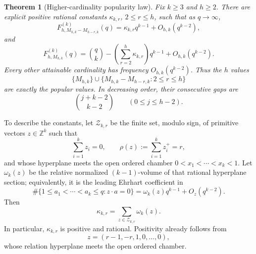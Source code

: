 \documentclass[11pt,reqno]{amsart}
\newtheorem{theorem}{Theorem}[section]
\theoremstyle{definition}
\theoremstyle{remark}
\begin{document}
\begin{theorem}[Higher-cardinality popularity law]
\label{thm:popularity-higher-k}
Fix $k\geq3$ and $h\geq2$.  There are explicit positive rational
constants $\kappa_{k,r}$, $2\leq r\leq h$, such that
as $q\to\infty$,
\begin{equation}\label{eq:pop-hk-tail}
 F^{(k)}_{h,M_{h,k}-M_{h-r,k}}(q)
 =\kappa_{k,r}q^{k-1}+O_{h,k}(q^{k-2}),
\end{equation}
and
\begin{equation}\label{eq:pop-hk-max}
 F^{(k)}_{h,M_{h,k}}(q)
 =\binom qk-
 \left(\sum_{r=2}^h\kappa_{k,r}\right)q^{k-1}
 +O_{h,k}(q^{k-2}).
\end{equation}
Every other attainable cardinality has frequency $O_{h,k}(q^{k-2})$.
Thus the $h$ values
\begin{equation}\label{eq:pop-hk-values}
 \{M_{h,k}\}\cup
 \{M_{h,k}-M_{h-r,k}:2\leq r\leq h\}
\end{equation}
are exactly the popular values.  In decreasing order, their consecutive
gaps are
\[
 \binom{j+k-2}{k-2}\qquad(0\leq j\leq h-2).
\]
\end{theorem}

To describe the constants, let $\mathcal Z_{k,r}$ be the finite set,
modulo sign, of primitive vectors $z\in\mathbb Z^k$ such that
\[
 \sum_{i=1}^kz_i=0,\qquad
 \rho(z):=\sum_{i=1}^kz_i^+=r,
\]
and whose hyperplane meets the open ordered chamber
$0<x_1<\cdots<x_k<1$.  Let $\omega_k(z)$ be the relative normalized
$(k-1)$-volume of that rational hyperplane section; equivalently, it is the
leading Ehrhart coefficient in
\begin{equation}\label{eq:pop-hk-ehrhart}
 \#\{1\leq a_1<\cdots<a_k\leq q:z\cdot a=0\}
 =\omega_k(z)q^{k-1}+O_z(q^{k-2}).
\end{equation}
Then
\begin{equation}\label{eq:pop-hk-kappa}
 \boxed{\ \kappa_{k,r}=
 \sum_{z\in\mathcal Z_{k,r}}\omega_k(z).\ }
\end{equation}
In particular, $\kappa_{k,r}$ is positive and rational.  Positivity already
follows from
\[
 z=(r-1,-r,1,0,\ldots,0),
\]
whose relation hyperplane meets the open ordered chamber.
\end{document}

